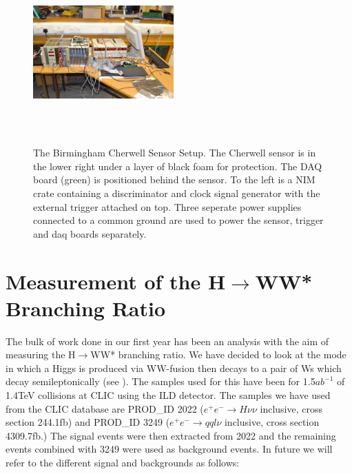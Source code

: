 \begin{figure}
  \centering
  \includegraphics[width=0.48\textwidth,height=7cm,keepaspectratio]{fig/basement}
  \caption[Birmingham Cherwell Sensor Setup]{The Birmingham Cherwell Sensor Setup. The Cherwell sensor is in the lower right under a layer of black foam for protection. The DAQ board (green) is positioned behind the sensor. To the left is a NIM crate containing a discriminator and clock signal generator  with the external trigger attached on top. Three seperate power supplies connected to a common ground are used to power the sensor, trigger and daq boards separately.}
  \label{Fig:basement}
\end{figure}

\section{Measurement of the H${\rightarrow}$WW* Branching Ratio}

The bulk of work done in our first year has been an analysis with the aim of measuring the H${\rightarrow}$WW* branching ratio. We have decided to look at the mode in which a Higgs is produced via WW-fusion then decays to a pair of Ws which decay semileptonically (see ). The samples used for this have been for 1.5${ab^{-1}}$ of 1.4TeV collisions at \ac{CLIC} using the \ac{ILD} detector. The samples we have used from the \ac{CLIC} database are PROD\_ID 2022 (${e^+e^-\rightarrow H\nu\nu}$ inclusive, cross section 244.1fb) and PROD\_ID 3249 (${e^+e^-\rightarrow qql\nu}$ inclusive, cross section 4309.7fb.) The signal events were then extracted from 2022 and the remaining events combined with 3249 were used as background events. In future we will refer to the different signal and backgrounds as follows:

